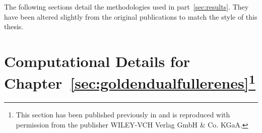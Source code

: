 The following sections detail the methodologies used in part~\ref{sec:results}.
They have been altered slightly from the original
publications\autocite{Trombach_HollowGoldCages_2016,Trombach_stickyhardsphereLennardJonestypeclusters_2018,Trombach_GregoryNewtonproblemkissing_2018}
to match the style of this thesis.

\section[Computational Details for
Chapter~\ref{sec:goldendualfullerenes}]{Computational Details for
Chapter~\ref{sec:goldendualfullerenes}\footnote{This section has been published
previously in
\autocite{Trombach_HollowGoldCages_2016}
and is reproduced with permission from the publisher 
WILEY-VCH Verlag GmbH \& Co. KGaA.}}
\label{sec:ComputationalDetailsforGoldenDualFullerenes}

